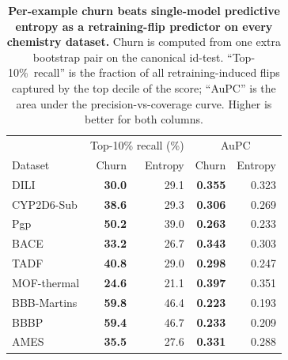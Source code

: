 \begin{table}[h]
  \centering
  \caption{\textbf{Per-example churn beats single-model predictive entropy as a retraining-flip predictor on every chemistry dataset.}  Churn is computed from one extra bootstrap pair on the canonical id-test.  ``Top-10\%\ recall'' is the fraction of all retraining-induced flips captured by the top decile of the score; ``AuPC'' is the area under the precision-vs-coverage curve.  Higher is better for both columns.}
  \label{tab:entropy_vs_fragility}
  \small
  \begin{tabular}{lrrrr}
    \toprule
    & \multicolumn{2}{c}{Top-10\% recall (\%)} & \multicolumn{2}{c}{AuPC} \\
    Dataset & Churn & Entropy & Churn & Entropy \\
    \midrule
    DILI & \textbf{30.0} & 29.1 & \textbf{0.355} & 0.323 \\
    CYP2D6-Sub & \textbf{38.6} & 29.3 & \textbf{0.306} & 0.269 \\
    Pgp & \textbf{50.2} & 39.0 & \textbf{0.263} & 0.233 \\
    BACE & \textbf{33.2} & 26.7 & \textbf{0.343} & 0.303 \\
    TADF & \textbf{40.8} & 29.0 & \textbf{0.298} & 0.247 \\
    MOF-thermal & \textbf{24.6} & 21.1 & \textbf{0.397} & 0.351 \\
    BBB-Martins & \textbf{59.8} & 46.4 & \textbf{0.223} & 0.193 \\
    BBBP & \textbf{59.4} & 46.7 & \textbf{0.233} & 0.209 \\
    AMES & \textbf{35.5} & 27.6 & \textbf{0.331} & 0.288 \\
    \bottomrule
  \end{tabular}
\end{table}
